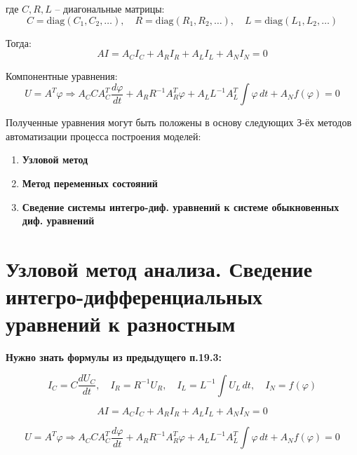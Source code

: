 	где \(C, R , L\) – диагональные матрицы: 
	\begin{equation}
		C = \mathrm{diag}(C_1, C_2, \ldots), \quad
		R = \mathrm{diag}(R_1, R_2, \ldots), \quad
		L = \mathrm{diag}(L_1, L_2, \ldots)
	\end{equation}
	
	Тогда:
	\begin{equation}
		A I = A_C I_C + A_R I_R + A_L I_L + A_N I_N = 0
	\end{equation}
	
	Компонентные уравнения:
	\begin{equation}
		U = A^T \varphi \Rightarrow
		A_C C A_C^T \frac{d\varphi}{dt} + 
		A_R R^{-1} A_R^T \varphi + 
		A_L L^{-1} A_L^T \int \varphi \, dt + 
		A_N f(\varphi) = 0
	\end{equation}
	
	Полученные уравнения могут быть положены в основу следующих З-ёх методов автоматизации процесса построения моделей:
	\begin{enumerate}
		\item \textbf{Узловой метод}
		\item \textbf{Метод переменных состояний}
		\item \textbf{Сведение системы интегро-диф. уравнений к системе обыкновенных диф. уравнений}
	\end{enumerate}
	
	\newpage
	
	\section{Узловой метод анализа. Сведение интегро-дифференциальных уравнений к разностным}
	
	\textbf{Нужно знать формулы из предыдущего п.19.3:}
	
	\begin{equation}
		I_C = C \frac{dU_C}{dt}, \quad
		I_R = R^{-1} U_R, \quad
		I_L = L^{-1} \int U_L \, dt, \quad
		I_N = f(\varphi)
	\end{equation}
	
	\begin{equation}
		A I = A_C I_C + A_R I_R + A_L I_L + A_N I_N = 0
		\label{eq:ai_decomposition_1}
	\end{equation}
	
	\begin{equation}
		U = A^T \varphi \Rightarrow
		A_C C A_C^T \frac{d\varphi}{dt} + 
		A_R R^{-1} A_R^T \varphi + 
		A_L L^{-1} A_L^T \int \varphi \, dt + 
		A_N f(\varphi) = 0
		\label{eq:potential_balance_1}
	\end{equation}
	
